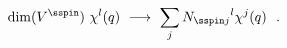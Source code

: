 \begin{equation} \label{abs} \dim (V^{\sspin }) \   
\chi^{l} (q)\ \longrightarrow\ \sum_j {N_{\sspin  j}}^{l} \chi^{j}(q)\ \ .
\end{equation}


